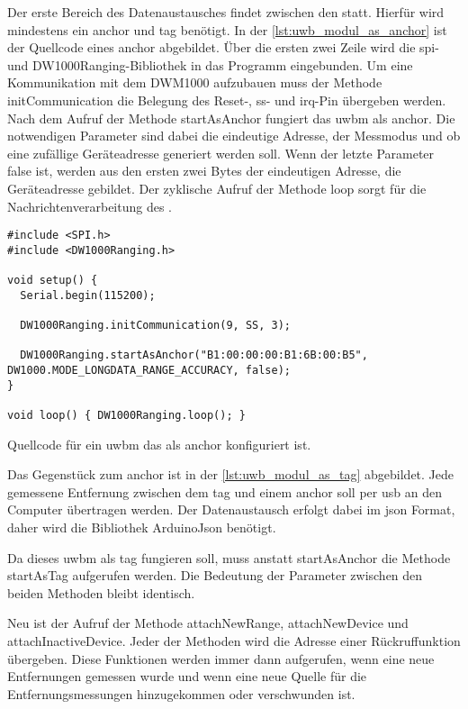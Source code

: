 Der erste Bereich des Datenaustausches findet zwischen den  statt. Hierfür wird mindestens ein \Gls{anchor} und \Gls{tag} benötigt. In der \autoref{lst:uwb_modul_as_anchor} ist der Quellcode eines \Gls{anchor} abgebildet.
Über die ersten zwei Zeile wird die \Gls{spi}- und DW1000Ranging-Bibliothek in das Programm eingebunden.
Um eine Kommunikation mit dem DWM1000 aufzubauen muss der Methode initCommunication die Belegung des Reset-, \Gls{ss}- und \Gls{irq}-Pin übergeben werden.
Nach dem Aufruf der Methode startAsAnchor fungiert das \Gls{uwbm} als \Gls{anchor}. Die notwendigen Parameter sind dabei die eindeutige Adresse, der Messmodus und ob eine zufällige Geräteadresse generiert werden soll. Wenn der letzte Parameter false ist, werden aus den ersten zwei Bytes der eindeutigen Adresse, die Geräteadresse gebildet. Der zyklische Aufruf der Methode loop sorgt für die Nachrichtenverarbeitung des .

\begin{listing}
	\begin{verbatim}
#include <SPI.h>
#include <DW1000Ranging.h>

void setup() {
  Serial.begin(115200);

  DW1000Ranging.initCommunication(9, SS, 3);
  
  DW1000Ranging.startAsAnchor("B1:00:00:00:B1:6B:00:B5", DW1000.MODE_LONGDATA_RANGE_ACCURACY, false);
}

void loop() { DW1000Ranging.loop(); }
	\end{verbatim}
	\unskip
	\caption{Quellcode für ein \Gls{uwbm} das als \Gls{anchor} konfiguriert ist.}
	\label{lst:uwb_modul_as_anchor}
\end{listing}

Das Gegenstück zum \Gls{anchor} ist in der \autoref{lst:uwb_modul_as_tag} abgebildet. Jede gemessene Entfernung zwischen dem \Gls{tag} und einem \Gls{anchor} soll per \Gls{usb} an den Computer übertragen werden. Der Datenaustausch erfolgt dabei im \Gls{json} Format, daher wird die Bibliothek ArduinoJson benötigt.

Da dieses \Gls{uwbm} als \Gls{tag} fungieren soll, muss anstatt startAsAnchor die Methode startAsTag aufgerufen werden. Die Bedeutung der Parameter zwischen den beiden Methoden bleibt identisch.

Neu ist der Aufruf der Methode attachNewRange, attachNewDevice und attachInactiveDevice. Jeder der Methoden wird die Adresse einer Rückruffunktion übergeben. Diese Funktionen werden immer dann aufgerufen, wenn eine neue Entfernungen gemessen wurde und wenn eine neue Quelle für die Entfernungsmessungen hinzugekommen oder verschwunden ist.

